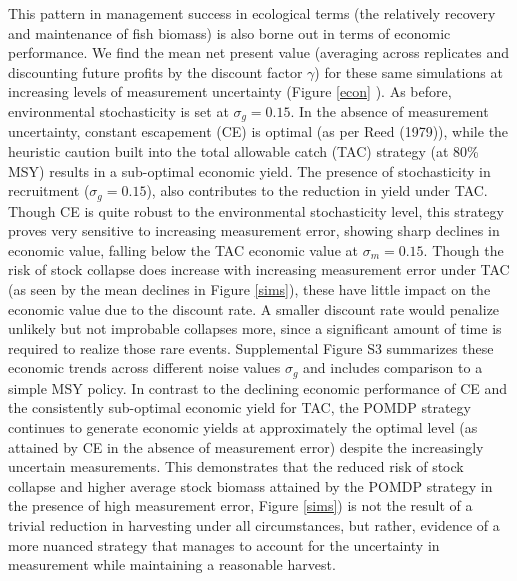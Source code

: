 \documentclass[3p]{elsarticle} %
\begin{document}
This pattern in management success in ecological terms (the relatively
recovery and maintenance of fish biomass) is also borne out in terms of
economic performance. We find the mean net present value (averaging
across replicates and discounting future profits by the discount factor
\(\gamma\)) for these same simulations at increasing levels of
measurement uncertainty (Figure \ref{econ} ). As before, environmental
stochasticity is set at \(\sigma_g = 0.15\). In the absence of
measurement uncertainty, constant escapement (CE) is optimal (as per
Reed (1979)), while the heuristic caution built into the total allowable
catch (TAC) strategy (at 80\% MSY) results in a sub-optimal economic
yield. The presence of stochasticity in recruitment
(\(\sigma_g = 0.15\)), also contributes to the reduction in yield under
TAC. Though CE is quite robust to the environmental stochasticity level,
this strategy proves very sensitive to increasing measurement error,
showing sharp declines in economic value, falling below the TAC economic
value at \(\sigma_m = 0.15\). Though the risk of stock collapse does
increase with increasing measurement error under TAC (as seen by the
mean declines in Figure \ref{sims}), these have little impact on the
economic value due to the discount rate. A smaller discount rate would
penalize unlikely but not improbable collapses more, since a significant
amount of time is required to realize those rare events. Supplemental
Figure S3 summarizes these economic trends across different noise values
\(\sigma_g\) and includes comparison to a simple MSY policy. In contrast
to the declining economic performance of CE and the consistently
sub-optimal economic yield for TAC, the POMDP strategy continues to
generate economic yields at approximately the optimal level (as attained
by CE in the absence of measurement error) despite the increasingly
uncertain measurements. This demonstrates that the reduced risk of stock
collapse and higher average stock biomass attained by the POMDP strategy
in the presence of high measurement error, Figure \ref{sims}) is not the
result of a trivial reduction in harvesting under all circumstances, but
rather, evidence of a more nuanced strategy that manages to account for
the uncertainty in measurement while maintaining a reasonable harvest.
\end{document}
